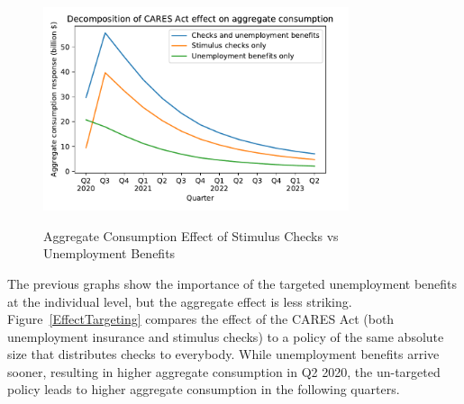 \begin{figure}
	\centering
	\caption{Aggregate Consumption Effect of Stimulus Checks vs Unemployment Benefits}
	\label{checks_vs_unemp}
	{ \includegraphics[width=0.8\textwidth]{./Figures/Checks_vs_Unemp}}
\end{figure}

The previous graphs show the importance of the targeted unemployment benefits at the individual level, but the aggregate effect is less striking.
Figure~\ref{EffectTargeting} compares the effect of the CARES Act (both unemployment insurance and stimulus checks) to a policy of the same absolute size that distributes checks to everybody.
While unemployment benefits arrive sooner, resulting in higher aggregate consumption in Q2 2020, the un-targeted policy leads to higher aggregate consumption in the following quarters.

